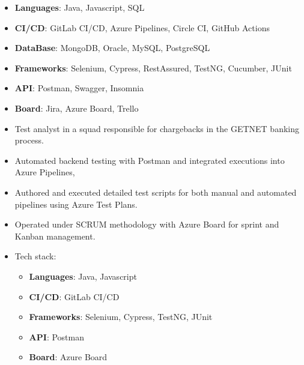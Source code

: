 {\begin{itemize}
    \begin{itemize}
        \item \textbf{Languages}: {\color{accent2}Java, Javascript, SQL}
        \item \textbf{CI/CD}: {\color{accent2}GitLab CI/CD, Azure Pipelines, Circle CI, GitHub Actions}
        \item \textbf{DataBase}: {\color{accent2}MongoDB, Oracle, MySQL, PostgreSQL}
        \item \textbf{Frameworks}: {\color{accent2}Selenium, Cypress, RestAssured, TestNG, Cucumber, JUnit}
        \item \textbf{API}: {\color{accent2}Postman, Swagger, Insomnia}
        \item \textbf{Board}: {\color{accent2}Jira, Azure Board, Trello}
    \end{itemize}
\end{itemize}

\begin{itemize}
    \item Test analyst in a squad responsible for chargebacks in the GETNET banking process.
    \item Automated backend testing with Postman and integrated executions into Azure Pipelines,
    \item Authored and executed detailed test scripts for both manual and automated pipelines using Azure Test Plans.
    \item Operated under SCRUM methodology with Azure Board for sprint and Kanban management.
    \item Tech stack:    
    \begin{itemize}
        \item \textbf{Languages}: {\color{accent2}Java, Javascript}
        \item \textbf{CI/CD}: {\color{accent2}GitLab CI/CD}
        \item \textbf{Frameworks}: {\color{accent2}Selenium, Cypress, TestNG, JUnit}
        \item \textbf{API}: {\color{accent2}Postman}
        \item \textbf{Board}: {\color{accent2}Azure Board}
    \end{itemize}
\end{itemize}

}
